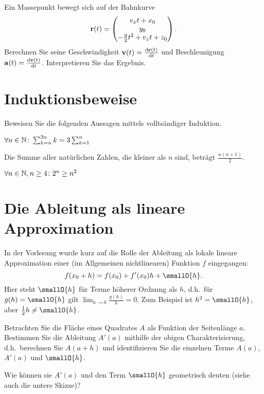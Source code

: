 \documentclass{scrartcl}
\begin{document}
Ein Massepunkt bewegt sich auf der Bahnkurve
\[
  \mathbf{r}(t) = \begin{pmatrix}v_x t + x_0 \\ y_0 \\ -\frac{g}{2} t^2 + v_z t + z_0\end{pmatrix}.
\]
Berechnen Sie seine Geschwindigkeit $\mathbf{v}(t) = \frac{\mathrm{d} \mathbf{r}(t)}{\mathrm{d} t}$ und Beschleunigung $\mathbf{a}(t) = \frac{\mathrm{d} \mathbf{v}(t)}{\mathrm{d} t}$.
Interpretieren Sie das Ergebnis.


\section{Induktionsbeweise}
Beweisen Sie die folgenden Aussagen mittels volltsändiger Induktion.
\begin{subex}
  \item $\forall n \in \mathbb{N}\colon \sum_{k = n}^{2n} k = 3 \sum_{k=1}^n$
  \item Die Summe aller natürlichen Zahlen, die kleiner als $n$ sind, beträgt $\frac{n(n+1)}{2}$.
  \item $\forall n \in \mathbb{N}, n \ge 4\colon 2^n \ge n^2$
\end{subex}

\section{Die Ableitung als lineare Approximation }
\label{sec:ableitung_als_lineare_approximation}

In der Vorlesung wurde kurz auf die Rolle der Ableitung als lokale lineare Approximation einer (im Allgemeinen nichtlinearen) Funktion $f$ eingegangen:
\[
  f(x_0 + h) = f(x_0) + f'(x_0) h + \smallO{h}.
\]
Hier steht $\smallO{h}$ für Terme höherer Ordnung als $h$, d.h.\ für $g(h) = \smallO{h}$ gilt $\lim_{h \to 0} \frac{g(h)}{h} = 0$.
Zum Beispiel ist $h^2 = \smallO{h}$, aber $\frac{1}{2}h \neq \smallO{h}$.

Betrachten Sie die Fläche eines Quadrates $A$ als Funktion der Seitenlänge $a$.
Bestimmen Sie die Ableitung $A'(a)$ mithilfe der obigen Charakterisierung, d.h.\ berechnen Sie $A(a + h)$ und identifizieren Sie die einzelnen Terme $A(a)$, $A'(a)$ und $\smallO{h}$.

Wie können sie $A'(a)$ und den Term $\smallO{h}$ geometrisch deuten (siehe auch die untere Skizze)?

\begin{center}
\end{center}
\end{document}
